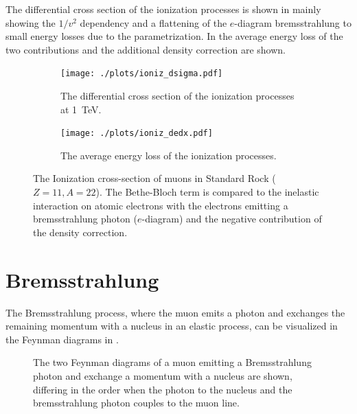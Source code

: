 The differential cross section of the ionization processes is shown in  mainly showing the $1/v^2$ dependency and a flattening of the $e$-diagram bremsstrahlung to small energy losses due to the parametrization.
In  the average energy loss of the two contributions and the additional density correction are shown.
\begin{figure}
    \centering
    \begin{subfigure}{0.9\textwidth}
        \centering
        \texttt{[image: ./plots/ioniz\_dsigma.pdf]}
        \caption{The differential cross section of the ionization processes at \SI{1}{TeV}.}
        \label{fig:ioniz_dsigma}
        \vspace{0.5cm}
    \end{subfigure}
    \begin{subfigure}{0.9\textwidth}
        \centering
        \texttt{[image: ./plots/ioniz\_dedx.pdf]}
        \caption{The average energy loss of the ionization processes.}
        \label{fig:ioniz_dedx}
    \end{subfigure}
    \caption{The Ionization cross-section of muons in Standard Rock ($Z=11, A=22$). The Bethe-Bloch term is compared to the inelastic interaction on atomic electrons with the electrons emitting a bremsstrahlung photon ($e$-diagram) and the negative contribution of the density correction.}
    \label{fig:ioniz}
\end{figure}

%
%

\section{Bremsstrahlung}

The Bremsstrahlung process, where the muon emits a photon and exchanges the remaining momentum with a nucleus in an elastic process, can be visualized in the Feynman diagrams in .
\begin{figure}
    \centering
    
    \caption{The two Feynman diagrams of a muon emitting a Bremsstrahlung photon and exchange a momentum with a nucleus are shown, differing in the order when the photon to the nucleus and the bremsstrahlung photon couples to the muon line.}
    \label{fig:feyn_brems}
\end{figure}

